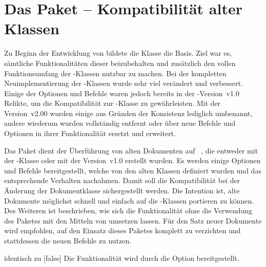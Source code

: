 \section{Das Paket  -- Kompatibilität alter Klassen}
\begin{Declaration*}{}
%
%
%
%
\noindent{}

\bigskip\noindent
Zu Beginn der Entwicklung von \TUDScript bildete die Klasse 
die Basis. Ziel war es, sämtliche Funktionalitäten dieser beizubehalten und 
zusätzlich den vollen Funktionsumfang der \KOMAScript-Klassen nutzbar zu 
machen. Bei der kompletten Neuimplementierung der \TUDScript-Klassen wurde sehr 
viel verändert und verbessert. Einige der Optionen und Befehle waren jedoch 
bereits in der \TUDScript-Version~v1.0 Relikte, um die Kompatibilität zur 
-Klasse zu gewährleisten. Mit der Version~v2.00 wurden einige 
aus Gründen der Konsistenz lediglich umbenannt, andere wiederum wurden 
vollständig entfernt oder über neue Befehle und Optionen in ihrer 
Funktionalität ersetzt und erweitert. 

Das Paket  dient der Überführung von alten Dokumenten auf 
\TUDScript~\vTUDScript, die entweder mit der -Klasse oder mit 
der Version~v1.0 erstellt wurden. Es werden einige Optionen und Befehle 
bereitgestellt, welche von den alten Klassen definiert wurden und das 
entsprechende Verhalten nachahmen. Damit soll die Kompatibilität bei der 
Änderung der Dokumentklasse sichergestellt werden. Die Intention ist, alte 
Dokumente möglichst schnell und einfach auf die \TUDScript-Klassen portieren zu 
können. Des Weiteren ist beschrieben, wie sich die Funktionalität ohne die 
Verwendung des Paketes mit den Mitteln von \TUDScript umsetzen lassen. Für den 
Satz neuer Dokumente wird empfohlen, auf den Einsatz dieses Paketes komplett zu 
verzichten und stattdessen die neuen Befehle zu nutzen.

\begin{Declaration}{}{%
  identisch zu [false]%
}
\printdeclarationlist%
%
Die Funktionalität wird durch die Option  bereitgestellt.
\end{Declaration}


\end{Declaration*}
